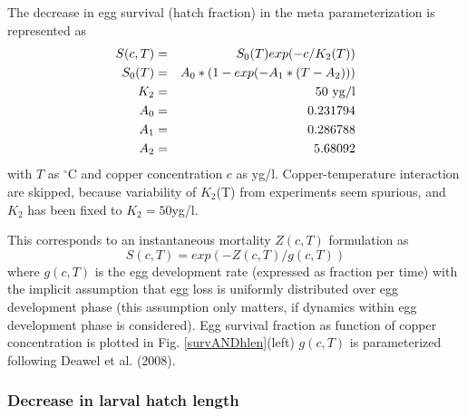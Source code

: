 The decrease in egg survival (hatch fraction) in the meta parameterization is represented as 
\begin{eqnarray*}
          S(c,T) & = & S_0(T) exp(- c / K_2(T))  \\
          S_0(T)  & = & A_0*(1 - exp(-A_1*(T-A_2)))\\
          K_2     & = & 50 {\ \rm yg/l} \\
	  A_0     & = & 0.231794 \\
          A_1     & = & 0.286788 \\
          A_2     & = & 5.68092  \\
\end{eqnarray*}
with $T$ as $^\circ$C and copper concentration $c$ as yg/l.
Copper-temperature interaction are skipped, because variability of $K_2$(T)
from experiments seem spurious, and $K_2$ has been fixed to $K_2  = 50 $yg/l.

This corresponds to an instantaneous mortality $Z(c,T)$ formulation as 
\begin{equation}
           S(c,T) =  exp( -Z(c,T)/g(c,T) ) \nonumber
\end{equation}
where $g(c,T)$ is the egg development rate (expressed as fraction per time) with the
implicit assumption that egg loss is uniformly distributed over egg development phase
(this assumption only matters, if dynamics within egg development phase is considered).
Egg survival fraction as function of copper concentration is plotted in Fig. \ref{survANDhlen}(left)
$g(c,T)$ is parameterized following Deawel et al. (2008).
\subsubsection{Decrease in larval hatch length} 

